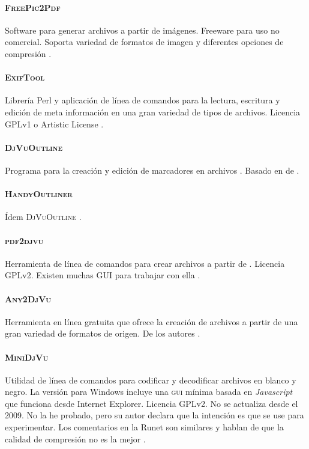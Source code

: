 \documentclass[%
	a5paper,
	10pt,
	twoside,
	openright,
	final,
]{memoir}
\begin{document}
{	\paragraph{\textsc{FreePic2Pdf}} Software para generar archivos \pdf a partir de imágenes. Freeware para uso no comercial. Soporta variedad de formatos de imagen y diferentes opciones de compresión \cite{FreePic2Pdf}.
	\paragraph{\textsc{ExifTool}}Librería Perl y aplicación de línea de comandos para la lectura, escritura y edición de meta información en una gran variedad de tipos de archivos. Licencia GPLv1 o Artistic License \cite{ExifTool}.
	\paragraph{\textsc{DjVuOutline}} Programa para la creación y edición de marcadores en archivos \djvu. Basado en  de \djvulibre \cite{DjVuOutline}.
	\paragraph{\textsc{HandyOutliner}} Ídem \textsc{DjVuOutline} \cite{HandyOutliner}.
	\paragraph{\textsc{pdf2djvu}} Herramienta de línea de comandos para crear archivos \djvu a partir de \pdf. Licencia GPLv2. Existen muchas GUI para trabajar con ella \cite{pdf2djvu}.
	\paragraph{\textsc{Any2DjVu}} Herramienta en línea gratuita que ofrece la creación de archivos \djvu a partir de una gran variedad de formatos de origen. De los autores \djvulibre \cite{Any2DjVu}.
	\paragraph{\textsc{MiniDjVu}} Utilidad de línea de comandos para codificar y decodificar archivos \djvu en blanco y negro. La versión para Windows incluye una \textsc{gui} mínima basada en \emph{Javascript} que funciona desde Internet Explorer. Licencia GPLv2. No se actualiza desde el 2009. No la he probado, pero su autor declara que la intención es que se use para experimentar. Los comentarios en la Runet \cite{WikipediaRunet} son similares y hablan de que la calidad de compresión no es la mejor \cite{MiniDjVu}.
}
\end{document}
